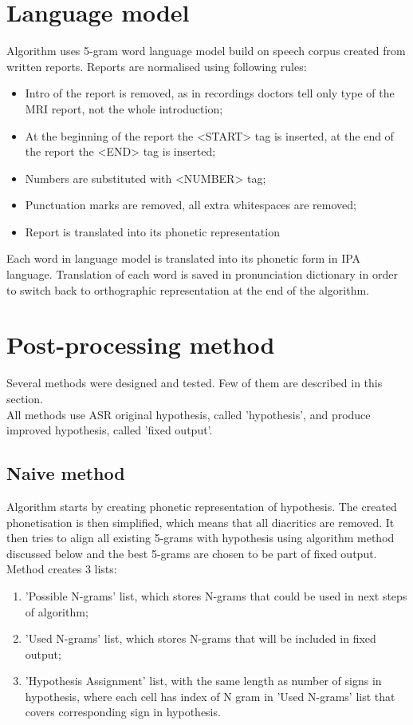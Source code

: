 \documentclass[a4paper,11pt,twoside]{report}
\theoremstyle{definition}
\begin{document}
\section{Language model}
Algorithm uses 5-gram word language model build on speech corpus created from written reports. Reports are normalised using following rules:
\begin{itemize}
    \item Intro of the report is removed, as in recordings doctors tell only type of the MRI report, not the whole introduction;
    \item At the beginning of the report the <START> tag is inserted, at the end of the report the <END> tag is inserted;
    \item Numbers are substituted with <NUMBER> tag;
    \item Punctuation marks are removed, all extra whitespaces are removed;
    \item Report is translated into its phonetic representation
\end{itemize}
Each word in language model is translated into its phonetic form in IPA language. Translation of each word is saved in pronunciation dictionary in order to switch back to orthographic representation at the end of the algorithm.

\section{Post-processing method}

Several methods were designed and tested. Few of them are described in this section.\\
All methods use ASR original hypothesis, called 'hypothesis', and produce improved hypothesis, called 'fixed output'. 

\subsection{Naive method} \label{sec:met1}

Algorithm starts by creating phonetic representation of hypothesis. The created phonetisation is then simplified, which means that all diacritics are removed. It then tries to align all existing 5-grams with hypothesis using algorithm method discussed below and the best 5-grams are chosen to be part of fixed output.\\

Method creates 3 lists:
\begin{enumerate}
    \item 'Possible N-grams' list, which stores N-grams that could be used in next steps of algorithm;
    \item 'Used N-grams' list, which stores N-grams that will be included in fixed output;
    \item 'Hypothesis Assignment' list, with the same length as number of signs in hypothesis, where each cell has index of N gram in 'Used N-grams' list that covers corresponding sign in hypothesis.  
\end{enumerate}
\end{document}
